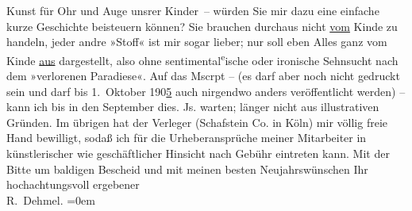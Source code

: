 \begin{ledgroupsized}[t]{13cm}
                    Kunst für Ohr und Auge unsrer Kinder –\pend
           \pstart
           \noindent{}{\pb}würden Sie mir dazu eine einfache kurze Geschichte
                    beisteuern können? Sie brauchen durchaus nicht \uline{vom} Kinde zu handeln, jeder andre »Stoff« ist mir sogar lieber; nur
                    soll eben Alles ganz vom Kinde \uline{aus} dargestellt,
                    also ohne sentimental\substVorne{}\textsuperscript{e}\substDazwischen{}ische\substHinten{} oder ironische Sehnsucht nach dem »verlorenen Paradiese«. Auf das
                    Mscrpt – (es darf aber noch nicht gedruckt sein und darf bis 1. Oktober
                            190\uline{5} auch nirgendwo anders veröffentlicht werden) – kann ich bis in den
                        September dies. Js. warten; länger {\pb}nicht aus illustrativen Gründen. Im übrigen hat der Verleger (Schafstein {\kaufmannsund} Co. in Köln) mir völlig freie Hand bewilligt, sodaß
                    ich für die Urheberansprüche meiner Mitarbeiter in künstlerischer wie
                    geschäftlicher Hinsicht nach Gebühr eintreten kann.\pend
           \pstart
           Mit der Bitte um baldigen Bescheid und mit meinen besten Neujahrswünschen\pend
           \pstart
           Ihr hochachtungsvoll ergebener{\\[\baselineskip]}\spacefill\mbox{R. Dehmel.}\pend
           \leftskip=0em{}
         
         \endnumbering{}\end{ledgroupsized}  \newcommand{\dateiname}{L01194}\newcommand{\titel}{Richard Dehmel an Arthur Schnitzler, 1. 1. 1902}\newcommand{\editorInnen}{ Martin Anton Müller und Gerd-Hermann Susen}
      